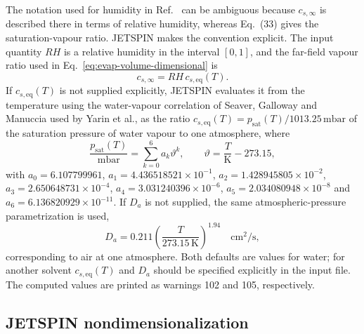The notation used for humidity in Ref.~\cite{yarin2001bending} can be
ambiguous because $c_{s,\infty}$ is described there in terms of relative
humidity, whereas Eq.~(33) gives the saturation-vapour ratio.  JETSPIN
makes the convention explicit.  The input quantity $RH$ is a relative
humidity in the interval $[0,1]$, and the far-field vapour ratio used in
Eq.~\ref{eq:evap-volume-dimensional} is
\begin{equation}
 c_{s,\infty}=RH\,c_{s,\mathrm{eq}}(T).
 \label{eq:evap-humidity}
\end{equation}
If $c_{s,\mathrm{eq}}(T)$ is not supplied explicitly, JETSPIN evaluates
it from the temperature using the water-vapour correlation of Seaver,
Galloway and Manuccia used by Yarin et al., as the ratio
$c_{s,\mathrm{eq}}(T)=p_{\mathrm{sat}}(T)/1013.25\,\mathrm{mbar}$ of
the saturation pressure of water vapour to one atmosphere, where
\begin{equation}
 \frac{p_{\mathrm{sat}}(T)}{\mathrm{mbar}}=\sum_{k=0}^{6}a_k\vartheta^k,
 \qquad
 \vartheta=\frac{T}{\mathrm{K}}-273.15,
 \label{eq:evap-psat}
\end{equation}
with $a_0=6.107799961$, $a_1=4.436518521\times10^{-1}$,
$a_2=1.428945805\times10^{-2}$, $a_3=2.650648731\times10^{-4}$,
$a_4=3.031240396\times10^{-6}$, $a_5=2.034080948\times10^{-8}$ and
$a_6=6.136820929\times10^{-11}$.  If $D_a$ is not supplied,
the same atmospheric-pressure parametrization is used,
\begin{equation}
 D_a=0.211\left(\frac{T}{273.15\,\mathrm{K}}\right)^{1.94}
 \quad \mathrm{cm^2/s},
 \label{eq:evap-default-diffusivity}
\end{equation}
corresponding to air at one atmosphere.  Both defaults are values for
water; for another solvent $c_{s,\mathrm{eq}}(T)$ and $D_a$ should be
specified explicitly in the input file.  The computed values are printed
as warnings 102 and 105, respectively.

\subsection{JETSPIN nondimensionalization}

